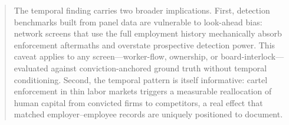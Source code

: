 \documentclass[12 pt]{elsarticle}
\begin{document}
\begin{frontmatter}
\begin{abstract}
The temporal finding carries two broader implications. First, detection benchmarks built from panel data are vulnerable to look-ahead bias: network screens that use the full employment history mechanically absorb enforcement aftermaths and overstate prospective detection power. This caveat applies to any screen---worker-flow, ownership, or board-interlock---evaluated against conviction-anchored ground truth without temporal conditioning. Second, the temporal pattern is itself informative: cartel enforcement in thin labor markets triggers a measurable reallocation of human capital from convicted firms to competitors, a real effect that matched employer--employee records are uniquely positioned to document.
\end{abstract}
\end{frontmatter}



\bigskip
\clearpage







%

\clearpage
\newpage


\newpage
\end{document}
